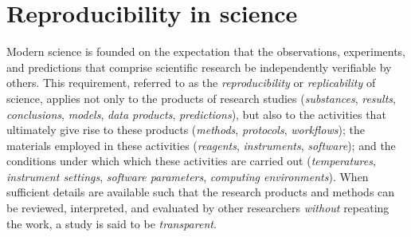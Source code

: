 \section{Reproducibility in science}\label{sec-reproducibility}

Modern science is founded on the expectation that the observations, experiments, and
	predictions that comprise scientific research be independently verifiable by others.
This requirement, referred to as the \emph{reproducibility} or \emph{replicability} of
	science, applies not only to the products of research studies (\emph{substances},
	\emph{results}, \emph{conclusions}, \emph{models}, \emph{data products},
	\emph{predictions}), but also to the activities that ultimately give rise to these
	products (\emph{methods}, \emph{protocols}, \emph{workflows}); the materials
	employed in these activities (\emph{reagents}, \emph{instruments},
	\emph{software}); and the conditions
	under which which these activities are carried out (\emph{temperatures},
	\emph{instrument settings}, \emph{software parameters},
	\emph{computing environments}).  When sufficient details are available
	such that the research products and methods can be reviewed, interpreted, and
	evaluated by other researchers \emph{without} repeating the work, a study is said to be
	\emph{transparent}.

